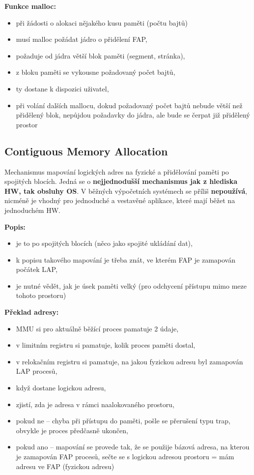 \documentclass[a4paper, 11pt]{article}
\begin{document}
\newpage
\textbf{Funkce malloc:}
\begin{itemize}
    \item při žádosti o alokaci nějakého kusu paměti (počtu bajtů)
    \item musí malloc požádat jádro o přidělení FAP,
    \item požaduje od jádra větší blok paměti (segment, stránka),
    \item z bloku paměti se vykousne požadovaný počet bajtů,
    \item ty dostane k dispozici uživatel,
    \item při volání dalších mallocu, dokud požadovaný počet bajtů nebude větší než přidělený blok, nepůjdou požadavky do jádra, ale bude se čerpat již přidělený prostor
\end{itemize}

\subsection{Contiguous Memory Allocation}
Mechanismus mapování logických adres na fyzické a přidělování paměti po spojitých blocích. Jedná se o \textbf{nejjednodušší mechanismus jak z hlediska HW, tak obsluhy OS}. V běžných výpočetních systémech se příliš \textbf{nepoužívá}, nicméně je vhodný pro jednoduché a vestavěné aplikace, které mají běžet na jednoduchém HW.
 
\textbf{Popis:}
\begin{itemize}
    \item je to po spojitých blocích (něco jako spojité ukládání dat),
    \item k popisu takového mapování je třeba znát, ve kterém FAP je zamapován počátek LAP,
    \item je nutné vědět, jak je úsek paměti velký (pro odchycení přístupu mimo meze tohoto prostoru)
\end{itemize}
 
\textbf{Překlad adresy:}
\begin{itemize}
    \item MMU si pro aktuálně běžící proces pamatuje 2 údaje,
    \item v limitním registru si pamatuje, kolik proces paměti dostal,
    \item v relokačním registru si pamatuje, na jakou fyzickou adresu byl zamapován LAP procesů,
    \item když dostane logickou adresu,
    \item zjistí, zda je adresa v rámci naalokovaného prostoru,
    \item pokud ne -- chyba při přístupu do paměti, pošle se přerušení typu trap, obvykle je proces předčasně ukončen,
    \item pokud ano -- mapování se provede tak, že se použije bázová adresa, na kterou je zamapován FAP procesů, sečte se s logickou adresou prostoru = mám adresu ve FAP (fyzickou adresu)
\end{itemize}
 
\end{document}
